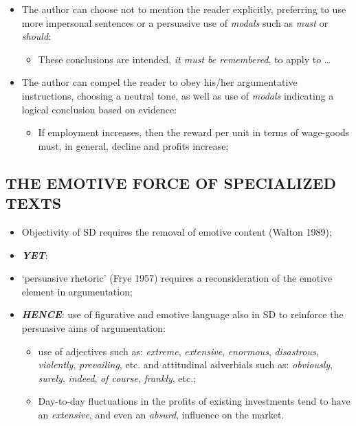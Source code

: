 \begin{itemize}
\item The author can choose not to mention the reader explicitly, preferring to use more impersonal sentences or a persuasive use of \textit{modals} such as \textit{must} or \textit{should}:

\begin{itemize}
\item These conclusions are intended, \textit{it must be remembered}, to apply to … 
\end{itemize}

\item The author can compel the reader to obey his/her argumentative instructions, choosing a neutral tone, as well as use of \textit{modals} indicating a logical conclusion based on evidence: 

\begin{itemize}
\item If employment increases, then the reward per unit in terms of wage-goods must, in general, decline and profits increase;
\end{itemize}

\end{itemize}

\subsection{THE EMOTIVE FORCE OF SPECIALIZED TEXTS}

\begin{itemize}

\item Objectivity of SD requires the removal of emotive content (Walton 1989);
\item \textbf{\textit{YET}}:
\item ‘persuasive rhetoric’ (Frye 1957) requires a reconsideration of the emotive element in argumentation;
\item \textbf{\textit{HENCE}}: use of figurative and emotive language also in SD to reinforce the persuasive aims of argumentation:

\begin{itemize}

\item use of adjectives such as: \textit{extreme}, \textit{extensive}, \textit{enormous}, \textit{disastrous}, \textit{violently}, \textit{prevailing}, etc. and attitudinal adverbials such as: \textit{obviously}, \textit{surely}, \textit{indeed}, \textit{of course}, \textit{frankly}, etc.; 

\item Day-to-day fluctuations in the profits of existing investments tend to have an \textit{extensive}, and even an \textit{absurd}, influence on the market. 

\end{itemize}

\end{itemize}


